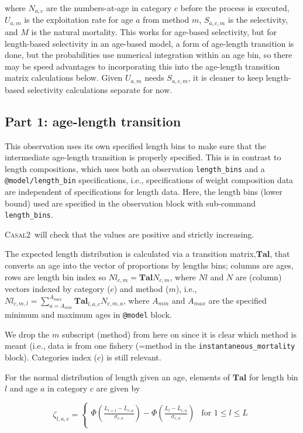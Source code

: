 \documentclass[a4paper,11pt,twoside,pdftex,draft]{article}
\newcommand{\CNAME}{\textsc{Casal2}}
\begin{document}
where $N_{a,c}$ are the numbers-at-age in category $c$ before the process is executed, $U_{a,m}$ is the exploitation rate for age $a$ from method $m$, $S_{a,c,m}$ is the selectivity, and $M$ is the natural mortality. This works for age-based selectivity, but for length-based selectivity in an age-based model, a form of age-length transition is done, but the probabilities use numerical integration within an age bin, so there may be speed advantages to incorporating this into the age-length transition matrix calculations below. Given $U_{a,m}$ needs $S_{a,c,m} $, it is cleaner to keep length-based selectivity calculations separate for now.




\subsection{Part 1: age-length transition}
This observation uses its own specified length bins to make sure that the intermediate age-length transition is properly specified. This is in contrast to length compositions, which uses both an observation \texttt{length\_bins} and a  \texttt{@model/length\_bin}  specifications, i.e., specifications of weight composition data are independent of specifications for length data. Here, the length bins (lower bound) used are specified in the observation block with sub-command \texttt{length\_bins}.

\CNAME~will check that the values are positive and strictly increasing. 

The expected length distribution is calculated via 
a transition matrix,$\mathbf{Tal}$, that converts an age into the vector of proportions by lengths bins; columns are ages, rows are length bin index so $Nl_{c,m} = \mathbf{Tal} N_{c,m}$, where $Nl$ and $N$ are (column) vectors indexed by category ($c$) and method ($m$), i.e.,
$Nl_{c,m,l} = \sum_{a=A_{min}}^{A_{max}}  \mathbf{Tal}_{l,a,c} N_{c,m,a}$, where $A_{min}$ and $A_{max}$ are the specified minimum and maximum ages in \texttt{@model} block.

We drop the $m$ subscript (method) from here on since it is clear which method is meant (i.e., data is from one fishery (=method in the \texttt{instantaneous\_mortality} block). Categories index ($c$) is still relevant.

For the normal distribution of length given an age, 
elements of $\mathbf{Tal}$ for length bin $l$ and age $a$ in category $c$ are given by

\begin{equation}
\zeta_{l,a,c} =
\begin{cases}

\Phi\left( \frac{L_{l+1} - \bar L_{c,a}   }{\sigma_{c,a}} \right) - \Phi\left( \frac{L_{l} - \bar L_{c,a}   }{\sigma_{c,a}} \right) & \text{for } 1 \leq l \leq L \\

\end{cases}
\end{equation}
\end{document}

